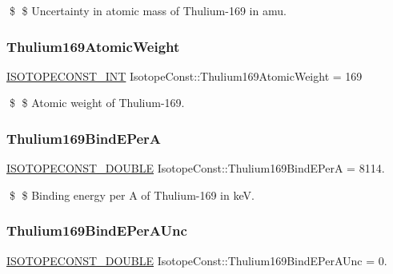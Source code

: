 \$ \$ Uncertainty in atomic mass of Thulium-\/169 in amu. \mbox{\label{group___isotope_const-_thulium-_tm169_gac618c3a620eb842260c0fd74bb03d41a}} 
\subsubsection{\texorpdfstring{Thulium169\+Atomic\+Weight}{Thulium169AtomicWeight}}
{\footnotesize\ttfamily \mbox{\hyperlink{group___isotope_const-_macros_ga5f18360b3e99483a35c32d789e62621c}{I\+S\+O\+T\+O\+P\+E\+C\+O\+N\+S\+T\+\_\+\+I\+NT}} Isotope\+Const\+::\+Thulium169\+Atomic\+Weight = 169}

\$ \$ Atomic weight of Thulium-\/169. \mbox{\label{group___isotope_const-_thulium-_tm169_ga67883620706e081ce9d761ebcad7802b}} 
\subsubsection{\texorpdfstring{Thulium169\+Bind\+E\+PerA}{Thulium169BindEPerA}}
{\footnotesize\ttfamily \mbox{\hyperlink{group___isotope_const-_macros_ga8f45a7272ce02c0b4c65c44636ed719a}{I\+S\+O\+T\+O\+P\+E\+C\+O\+N\+S\+T\+\_\+\+D\+O\+U\+B\+LE}} Isotope\+Const\+::\+Thulium169\+Bind\+E\+PerA = 8114.}

\$ \$ Binding energy per A of Thulium-\/169 in keV. \mbox{\label{group___isotope_const-_thulium-_tm169_ga4db4950db9731713c1de05a62f713f0d}} 
\subsubsection{\texorpdfstring{Thulium169\+Bind\+E\+Per\+A\+Unc}{Thulium169BindEPerAUnc}}
{\footnotesize\ttfamily \mbox{\hyperlink{group___isotope_const-_macros_ga8f45a7272ce02c0b4c65c44636ed719a}{I\+S\+O\+T\+O\+P\+E\+C\+O\+N\+S\+T\+\_\+\+D\+O\+U\+B\+LE}} Isotope\+Const\+::\+Thulium169\+Bind\+E\+Per\+A\+Unc = 0.}

